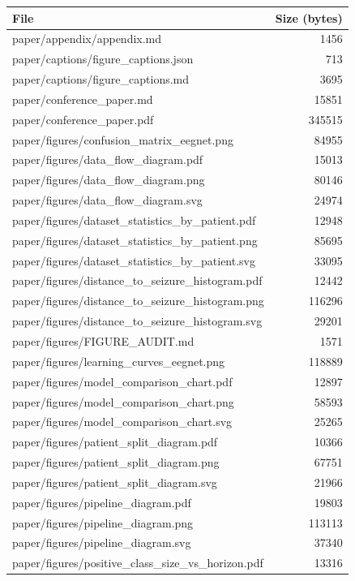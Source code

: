 \begin{tabular}{lr}
\toprule
File & Size (bytes) \\
\midrule
paper/appendix/appendix.md & 1456 \\
paper/captions/figure\_captions.json & 713 \\
paper/captions/figure\_captions.md & 3695 \\
paper/conference\_paper.md & 15851 \\
paper/conference\_paper.pdf & 345515 \\
paper/figures/confusion\_matrix\_eegnet.png & 84955 \\
paper/figures/data\_flow\_diagram.pdf & 15013 \\
paper/figures/data\_flow\_diagram.png & 80146 \\
paper/figures/data\_flow\_diagram.svg & 24974 \\
paper/figures/dataset\_statistics\_by\_patient.pdf & 12948 \\
paper/figures/dataset\_statistics\_by\_patient.png & 85695 \\
paper/figures/dataset\_statistics\_by\_patient.svg & 33095 \\
paper/figures/distance\_to\_seizure\_histogram.pdf & 12442 \\
paper/figures/distance\_to\_seizure\_histogram.png & 116296 \\
paper/figures/distance\_to\_seizure\_histogram.svg & 29201 \\
paper/figures/FIGURE\_AUDIT.md & 1571 \\
paper/figures/learning\_curves\_eegnet.png & 118889 \\
paper/figures/model\_comparison\_chart.pdf & 12897 \\
paper/figures/model\_comparison\_chart.png & 58593 \\
paper/figures/model\_comparison\_chart.svg & 25265 \\
paper/figures/patient\_split\_diagram.pdf & 10366 \\
paper/figures/patient\_split\_diagram.png & 67751 \\
paper/figures/patient\_split\_diagram.svg & 21966 \\
paper/figures/pipeline\_diagram.pdf & 19803 \\
paper/figures/pipeline\_diagram.png & 113113 \\
paper/figures/pipeline\_diagram.svg & 37340 \\
paper/figures/positive\_class\_size\_vs\_horizon.pdf & 13316 \\

\end{tabular}
